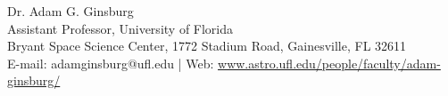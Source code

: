 \begin{center}
{\large Dr. Adam G. Ginsburg}\\
Assistant Professor, University of Florida\\
Bryant Space Science Center,
1772 Stadium Road,
Gainesville, FL 32611\\
E-mail: adamginsburg@ufl.edu | Web: \url{www.astro.ufl.edu/people/faculty/adam-ginsburg/} %
\end{center}

